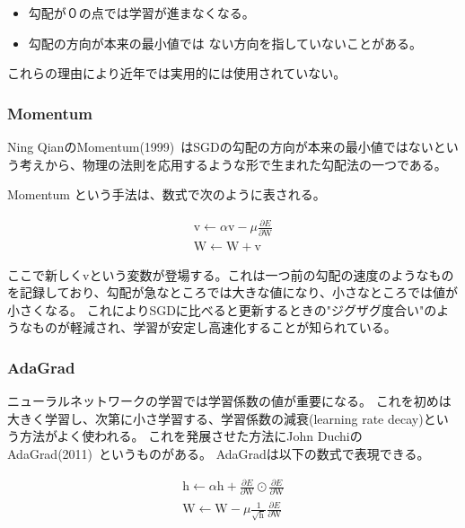 \begin{itemize}
  \item 勾配が０の点では学習が進まなくなる。
  \item 勾配の方向が本来の最小値では ない方向を指していないことがある。
\end{itemize}
これらの理由により近年では実用的には使用されていない。

\subsubsection{Momentum}

Ning QianのMomentum(1999)~\cite{momentum}はSGDの勾配の方向が本来の最小値ではないという考えから、物理の法則を応用するような形で生まれた勾配法の一つである。


Momentum という手法は、数式で次のように表される。

\begin{eqnarray}
    \mathrm{v} \leftarrow \alpha \mathrm{v} - \mu \frac {\partial E }{\partial \mathrm{W}} \\
    \mathrm{W} \leftarrow \mathrm{W+v}
\label{eq:momentum}
\end{eqnarray}

ここで新しく$ \mathrm{v} $という変数が登場する。これは一つ前の勾配の速度のようなものを記録しており、勾配が急なところでは大きな値になり、小さなところでは値が小さくなる。
これによりSGDに比べると更新するときの"ジグザグ度合い"のようなものが軽減され、学習が安定し高速化することが知られている。


\subsubsection{AdaGrad}

ニューラルネットワークの学習では学習係数の値が重要になる。
これを初めは大きく学習し、次第に小さ学習する、学習係数の減衰(learning rate decay)という方法がよく使われる。
これを発展させた方法にJohn DuchiのAdaGrad(2011)~\cite{adagrad}というものがある。
AdaGradは以下の数式で表現できる。

\begin{eqnarray}　
    \mathrm{h} \leftarrow \alpha \mathrm{h} + \frac {\partial E }{\partial \mathrm{W}} \odot \frac {\partial E }{\partial \mathrm{W}}  \\
    \mathrm{W} \leftarrow \mathrm{W}  - \mu \frac{ 1 }{\sqrt{\mathrm{h}}} \frac{ \partial E }{\partial \mathrm{W}} 
\label{eq:adagrad}
\end{eqnarray}

